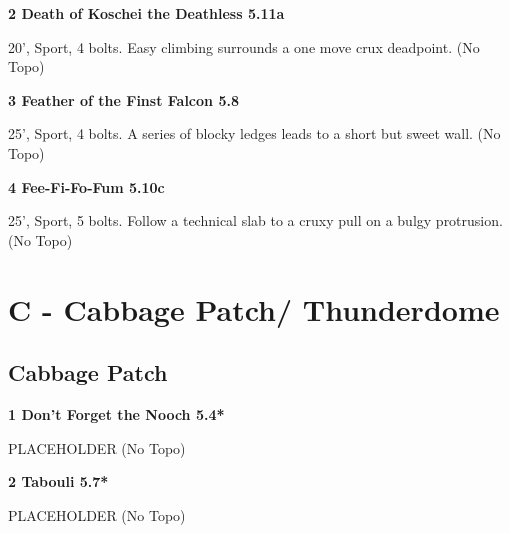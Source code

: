 \begin{multicols}{2}
\needspace{1.5cm}
\label{rt:Death of Koschei the Deathless}
\colorbox{RoyalBlue!20}{
\parbox{0.95\linewidth}{
\textbf{
2 Death of Koschei the Deathless 5.11a  
}}}
\begin{adjustwidth}{0.5cm}{}			
20', Sport, 4 bolts. Easy climbing surrounds a one move crux deadpoint.
  (No Topo)
\end{adjustwidth}




\needspace{1.5cm}
\label{rt:Feather of the Finst Falcon}
\colorbox{green!20}{
\parbox{0.95\linewidth}{
\textbf{
3 Feather of the Finst Falcon 5.8  
}}}
\begin{adjustwidth}{0.5cm}{}			
25', Sport, 4 bolts. A series of blocky ledges leads to a short but sweet wall.
  (No Topo)
\end{adjustwidth}




\needspace{1.5cm}
\label{rt:Fee-Fi-Fo-Fum}
\colorbox{RoyalBlue!20}{
\parbox{0.95\linewidth}{
\textbf{
4 Fee-Fi-Fo-Fum 5.10c  
}}}
\begin{adjustwidth}{0.5cm}{}			
25', Sport, 5 bolts. Follow a technical slab to a cruxy pull on a bulgy protrusion.
  (No Topo)
\end{adjustwidth}





\newpage

\section{C - Cabbage Patch/ Thunderdome}\label{sa:Cabbage Patch/ Thunderdome}




\needspace{1.5cm}
\subsection*{Cabbage Patch}\label{bf:Cabbage Patch}
	


\needspace{1.5cm}
\label{rt:Don't Forget the Nooch}
\colorbox{green!20}{
\parbox{0.95\linewidth}{
\textbf{
1 Don't Forget the Nooch 5.4*  
}}}
\begin{adjustwidth}{0.5cm}{}			
PLACEHOLDER
  (No Topo)
\end{adjustwidth}




\needspace{1.5cm}
\label{rt:Tabouli}
\colorbox{green!20}{
\parbox{0.95\linewidth}{
\textbf{
2 Tabouli 5.7*  
}}}
\begin{adjustwidth}{0.5cm}{}			
PLACEHOLDER
  (No Topo)
\end{adjustwidth}





\end{multicols}
